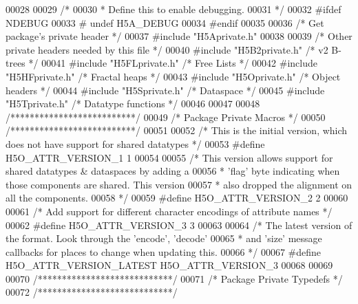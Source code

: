 \begin{DoxyCode}
00028 
00029 \textcolor{comment}{/*}
00030 \textcolor{comment}{ * Define this to enable debugging.}
00031 \textcolor{comment}{ */}
00032 \textcolor{preprocessor}{#ifdef NDEBUG}
00033 \textcolor{preprocessor}{#  undef H5A\_DEBUG}
00034 \textcolor{preprocessor}{#endif}
00035 
00036 \textcolor{comment}{/* Get package's private header */}
00037 \textcolor{preprocessor}{#include "H5Aprivate.h"}
00038 
00039 \textcolor{comment}{/* Other private headers needed by this file */}
00040 \textcolor{preprocessor}{#include "H5B2private.h"}    \textcolor{comment}{/* v2 B-trees               */}
00041 \textcolor{preprocessor}{#include "H5FLprivate.h"}    \textcolor{comment}{/* Free Lists               */}
00042 \textcolor{preprocessor}{#include "H5HFprivate.h"}    \textcolor{comment}{/* Fractal heaps            */}
00043 \textcolor{preprocessor}{#include "H5Oprivate.h"}     \textcolor{comment}{/* Object headers           */}
00044 \textcolor{preprocessor}{#include "H5Sprivate.h"}     \textcolor{comment}{/* Dataspace                */}
00045 \textcolor{preprocessor}{#include "H5Tprivate.h"}     \textcolor{comment}{/* Datatype functions           */}
00046 
00047 
00048 \textcolor{comment}{/**************************/}
00049 \textcolor{comment}{/* Package Private Macros */}
00050 \textcolor{comment}{/**************************/}
00051 
00052 \textcolor{comment}{/* This is the initial version, which does not have support for shared datatypes */}
00053 \textcolor{preprocessor}{#define H5O\_ATTR\_VERSION\_1  1}
00054 
00055 \textcolor{comment}{/* This version allows support for shared datatypes & dataspaces by adding a}
00056 \textcolor{comment}{ *      'flag' byte indicating when those components are shared.  This version}
00057 \textcolor{comment}{ *      also dropped the alignment on all the components.}
00058 \textcolor{comment}{ */}
00059 \textcolor{preprocessor}{#define H5O\_ATTR\_VERSION\_2  2}
00060 
00061 \textcolor{comment}{/* Add support for different character encodings of attribute names */}
00062 \textcolor{preprocessor}{#define H5O\_ATTR\_VERSION\_3      3}
00063 
00064 \textcolor{comment}{/* The latest version of the format.  Look through the 'encode', 'decode'}
00065 \textcolor{comment}{ *      and 'size' message callbacks for places to change when updating this.}
00066 \textcolor{comment}{ */}
00067 \textcolor{preprocessor}{#define H5O\_ATTR\_VERSION\_LATEST H5O\_ATTR\_VERSION\_3}
00068 
00069 
00070 \textcolor{comment}{/****************************/}
00071 \textcolor{comment}{/* Package Private Typedefs */}
00072 \textcolor{comment}{/****************************/}

\end{DoxyCode}
